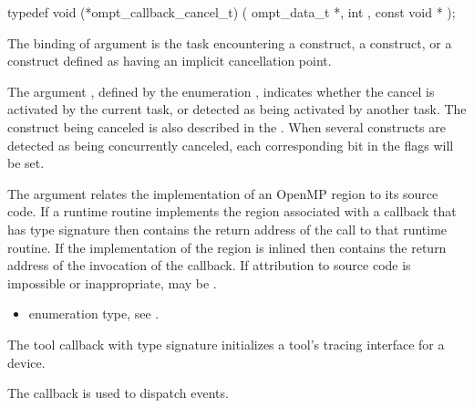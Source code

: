 \format

\begin{ccppspecific}
\begin{omptCallback}
typedef void (*ompt_callback_cancel_t) (
  ompt_data_t *,
  int ,
  const void *
);
\end{omptCallback}
\end{ccppspecific}


\argdesc

The binding of argument  is the task
encountering a  construct, a 
construct, or a construct defined as having an implicit cancellation
point.

The argument , defined by the enumeration
, indicates whether the cancel is
activated by the current task, or detected as being activated by
another task.  The construct being canceled is also described in the
. When several constructs are detected as being
concurrently canceled, each corresponding bit in the flags will be
set.

The  argument relates the implementation of an OpenMP region
to its source code. If a runtime routine implements the region associated with
a callback that has type signature  then
 contains the return address of the call to that runtime routine.
If the implementation of the region is inlined then  contains the
return address of the invocation of the callback. If attribution to source code
is impossible or inappropriate, may be .

\crossreferences
\begin{itemize}
\item {} enumeration type, see .
\end{itemize}



\label{sec:ompt_callback_device_initialize_t}

\summary The tool callback with type signature
 initializes a
tool's tracing interface for a device.

The  callback is used to dispatch
 events.

